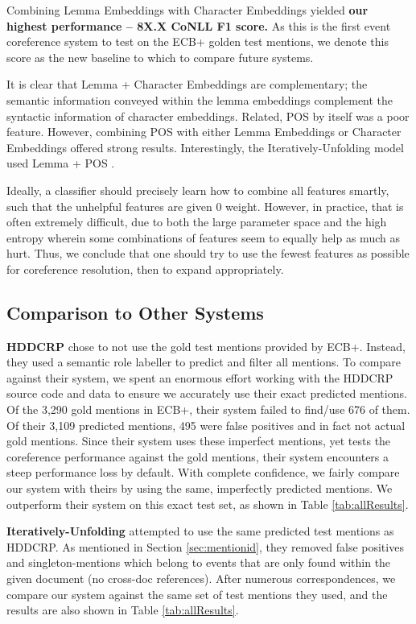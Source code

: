 \documentclass[11pt,a4paper]{article}
\begin{document}
Combining Lemma Embeddings with Character Embeddings yielded \textbf{our highest performance -- 8X.X CoNLL F1 score.}  As this is the first event coreference system to test on the ECB+ golden test mentions, we denote this score as the new baseline to which to compare future systems.

It is clear that Lemma + Character Embeddings are complementary; the semantic information conveyed within the lemma embeddings complement the syntactic information of character embeddings.  Related, POS by itself was a poor feature.  However, combining POS with either Lemma Embeddings or Character Embeddings offered strong results.  Interestingly, the Iteratively-Unfolding model used Lemma + POS .

Ideally, a classifier should precisely learn how to combine all features smartly, such that the unhelpful features are given 0 weight.  However, in practice, that is often extremely difficult, due to both the large parameter space and the high entropy wherein some combinations of features seem to equally help as much as hurt.  Thus, we conclude that one should try to use the fewest features as possible for coreference resolution, then to expand appropriately.

\subsection{Comparison to Other Systems}
\textbf{HDDCRP} chose to not use the gold test mentions provided by ECB+.  Instead, they used a semantic role labeller to predict and filter all mentions.
To compare against their system, we spent an enormous effort working with the HDDCRP source code and data to ensure we accurately use their exact predicted mentions.  Of the 3,290 gold mentions in ECB+, their system failed to find/use 676 of them.  Of their 3,109 predicted mentions, 495 were false positives and in fact not actual gold mentions.  Since their system uses these imperfect mentions, yet tests the coreference performance against the gold mentions, their system encounters a steep performance loss by default.  With complete confidence, we fairly compare our system with theirs by using the same, imperfectly predicted mentions.  We outperform their system on this exact test set, as shown in Table \ref{tab:allResults}.

\textbf{Iteratively-Unfolding} attempted to use the same predicted test mentions as HDDCRP.  As mentioned in Section \ref{sec:mentionid}, they removed false positives and singleton-mentions which belong to events that are only found within the given document (no cross-doc references).  After numerous correspondences, we compare our system against the same set of test mentions they used, and the results are also shown in Table \ref{tab:allResults}.
\end{document}
